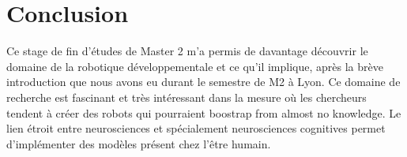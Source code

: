 \documentclass{llncs}
\begin{document}
\section{Conclusion}

Ce stage de fin d'études de Master 2 m'a permis de davantage découvrir le domaine de la robotique développementale et ce qu'il implique, après la brève introduction que nous avons eu durant le semestre de M2 à Lyon. Ce domaine de recherche est fascinant et très intéressant dans la mesure où les chercheurs tendent à créer des robots qui pourraient boostrap from almost no knowledge. Le lien étroit entre neurosciences et spécialement neurosciences cognitives permet d'implémenter des modèles présent chez l'être humain.

%
%



\end{document}
